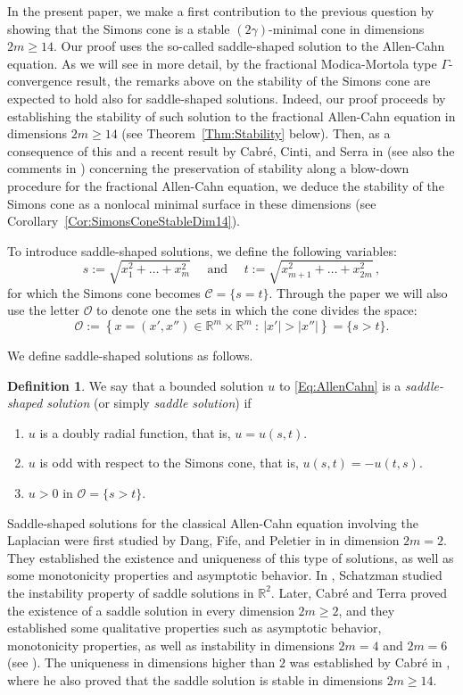 \documentclass[12pt,reqno]{amsart}
\theoremstyle{definition}
\newtheorem{definition}[theorem]{Definition}
\theoremstyle{remark}
\newcommand{\con}[1]{\mathbb{#1}}
\newcommand{\R}{\con{R}} %
\newcommand{\ocal}{\mathcal{O}}
\newcommand{\s}{\gamma}
\newcommand{\setcond}[2]{\left \{ #1 \ : \ #2  \right \}}
\numberwithin{equation}{section}
\begin{document}
In the present paper, we make a first contribution to the previous question by showing that the Simons cone is a stable $(2\s)$-minimal cone in dimensions $2m\geq 14$. Our proof uses the so-called saddle-shaped solution to the Allen-Cahn equation. As we will see in more detail, by the fractional Modica-Mortola type $\Gamma$-convergence result, the remarks above on the stability of the Simons cone are expected to hold also for saddle-shaped solutions. Indeed, our proof proceeds by establishing the stability of such solution to the fractional Allen-Cahn equation in dimensions $2m \geq 14$ (see Theorem~\ref{Thm:Stability} below). Then, as a consequence of this and a recent result by Cabré, Cinti, and Serra in \cite{CabreCintiSerra-Stable} (see also the comments in \cite{CabreCintiSerra-Cones}) concerning the preservation of stability along a blow-down procedure for the fractional Allen-Cahn equation, we deduce the stability of the Simons cone as a nonlocal minimal surface in these dimensions (see Corollary~\ref{Cor:SimonsConeStableDim14}). 

To introduce saddle-shaped solutions, we define the following variables:
$$
s := \sqrt{x_1^2 + \ldots + x_m^2 } \quad \text{ and } \quad 
t := \sqrt{x_{m+1}^2 + \ldots + x_{2m}^2}\,,
$$
for which the Simons cone becomes $\mathscr{C} = \{s=t\}$.
Through the paper we will also use the letter $\ocal$ to denote one the sets in which the cone divides the space:
$$
\ocal:= \setcond{x = (x', x'') \in \R^{m}\times \R^m}{|x'| > |x''|} = \{s > t\}.
$$

We define saddle-shaped solutions as follows.

\begin{definition}
\label{Def:SaddleShapedSol}
We say that a bounded solution $u$ to \eqref{Eq:AllenCahn} is a \emph{saddle-shaped solution} (or simply \emph{saddle solution}) if
\begin{enumerate}[label=(\roman{*})]
\item $u$ is a doubly radial function, that is, $u = u(s,t)$.
\item $u$ is odd with respect to the Simons cone, that is, $u(s,t)=-u(t,s)$.
\item $u > 0$ in $\ocal = \{s>t\}$.
\end{enumerate}
\end{definition}

Saddle-shaped solutions for the classical Allen-Cahn equation involving the Laplacian were first studied by Dang, Fife, and Peletier in \cite{DangFifePeletier} in dimension $2m=2$. They established the existence and uniqueness of this type of solutions, as well as some monotonicity properties and asymptotic behavior. In \cite{Schatzman}, Schatzman studied the instability property of saddle solutions in $\R^2$. Later, Cabré and Terra  proved the existence of a saddle solution in every dimension $2m\geq 2$, and they established some qualitative properties such as asymptotic behavior, monotonicity properties, as well as instability in dimensions $2m = 4$ and $2m = 6$ (see \cite{CabreTerraI,CabreTerraII}). The uniqueness in dimensions higher than $2$ was established by Cabré in \cite{Cabre-Saddle}, where he also proved that the saddle solution is stable in dimensions $2m \geq 14$.
\end{document}
